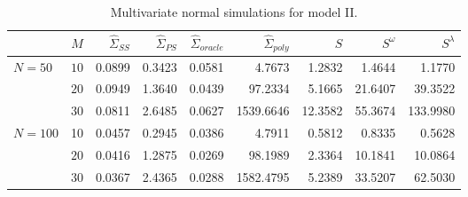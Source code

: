 \begin{table}[H]
\centering
\caption{Multivariate normal simulations for model II.}
\begin{tabular}{lrrrrrrrr}
 & $M$ &$\hat{\Sigma}_{SS}$& $\hat{\Sigma}_{PS}$ &$\hat{\Sigma}_{oracle}$& $\hat{\Sigma}_{poly}$ & $S$ &$S^\omega$& $S^\lambda$ \\ 
  \hline
   $N = 50$ & $10$ & 0.0899 & 0.3423 & 0.0581 & 4.7673 & 1.2832 & 1.4644 & 1.1770 \\ 
   & $20$ & 0.0949 & 1.3640 & 0.0439 & 97.2334 & 5.1665 & 21.6407 & 39.3522 \\ 
     & $30$ & 0.0811 & 2.6485 & 0.0627 & 1539.6646 & 12.3582 & 55.3674 & 133.9980 \\ 
  $N = 100$ & 10 & 0.0457 & 0.2945 & 0.0386 & 4.7911 & 0.5812 & 0.8335 & 0.5628 \\ 
    & $20$ & 0.0416 & 1.2875 & 0.0269 & 98.1989 & 2.3364 & 10.1841 & 10.0864 \\ 
    & $30$ & 0.0367 & 2.4365 & 0.0288 & 1582.4795 & 5.2389 & 33.5207 & 62.5030 \\ 
   \hline
\end{tabular}
\label{table:simulation-1-entropy-loss-sigma-2}
\end{table}
